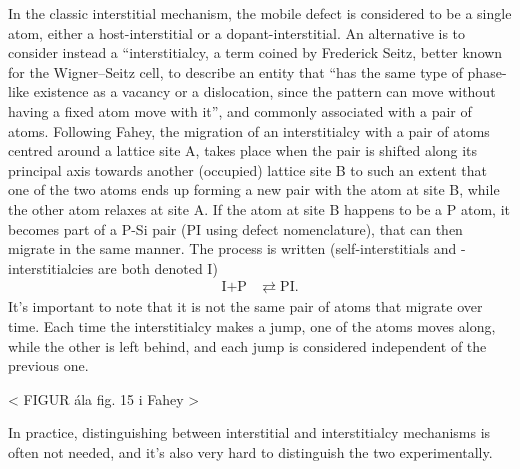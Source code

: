 \documentclass[11pt,bibliography=totoc,index=totoc]{scrbook}   %
\begin{document}
In the classic interstitial mechanism, the mobile defect is considered to be a single atom, either a host-interstitial or a dopant-interstitial. 
An alternative is to consider instead a ``interstitialcy, a term coined by Frederick Seitz, better known for the Wigner–Seitz cell, to describe an entity that ``has the same type of phase-like existence as a vacancy or a dislocation, since the pattern can move without having a fixed atom move with it'',\cite{Seitz:1950} 
and commonly associated with a pair of atoms.
Following Fahey,\cite[322]{Fahey:1989} the migration of an interstitialcy with a pair of atoms centred around a lattice site A, takes place when the pair is shifted along its principal axis towards another (occupied) lattice site B to such an extent that one of the two atoms ends up forming a new pair with the atom at site B, while the other atom relaxes at site A. 
If the atom at site B happens to be a P atom, it becomes part of a P-Si pair (PI using defect nomenclature), 
that can then migrate in the same manner.
The process is written (self-interstitials and -interstitialcies are both denoted I)
\begin{align*}
    \text{I} + \text{P} &\rightleftarrows \text{PI}.
\end{align*}
It's important to note that it is not the same pair of atoms that migrate over time.
Each time the interstitialcy makes a jump, one of the atoms moves along, while the other is left behind,
and each jump is considered independent of the previous one.\cite[323]{Fahey:1989}

< FIGUR ála fig. 15 i Fahey >

In practice, distinguishing between interstitial and interstitialcy mechanisms is often not needed, and it's also very hard to distinguish the two experimentally.\cite[295]{Fahey:1989}
\end{document}
